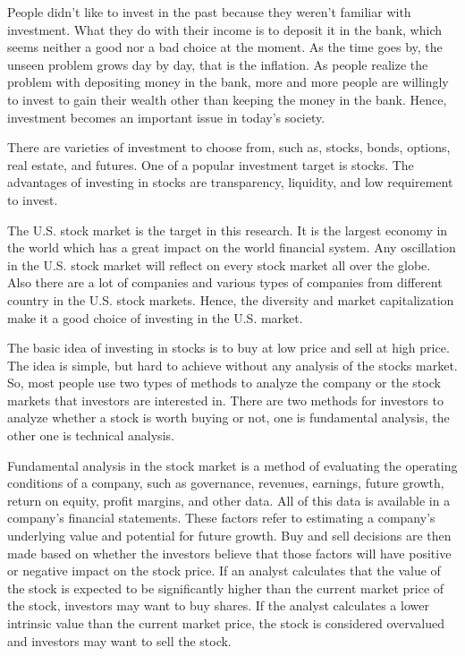 \documentclass[../main.tex]{subfiles}
\begin{document}

People didn't like to invest in the past because they weren't familiar with investment. What they do with their income is to deposit it in the bank, which seems neither a good nor a bad choice at the moment. As the time goes by, the unseen problem grows day by day, that is the inflation. As people realize the problem with depositing money in the bank, more and more people are willingly to invest to gain their wealth other than keeping the money in the bank. Hence, investment becomes an important issue in today's society.

\bigbreak

There are varieties of investment to choose from, such as, stocks, bonds, options, real estate, and futures. One of a popular investment target is stocks. The advantages of investing in stocks are transparency, liquidity, and low requirement to invest.

\bigbreak

The U.S. stock market is the target in this research. It is the largest economy in the world which has a great impact on the world financial system. Any oscillation in the U.S. stock market will reflect on every stock market all over the globe. Also there are a lot of companies and various types of companies from different country in the U.S. stock markets. Hence, the diversity and market capitalization make it a good choice of investing in the U.S. market.

\bigbreak

The basic idea of investing in stocks is to buy at low price and sell at high price. The idea is simple, but hard to achieve without any analysis of the stocks market. So, most people use two types of methods to analyze the company or the stock markets that investors are interested in. There are two methods for investors to analyze whether a stock is worth buying or not, one is fundamental analysis, the other one is technical analysis.

\bigbreak

Fundamental analysis in the stock market is a method of evaluating the operating conditions of a company, such as governance, revenues, earnings, future growth, return on equity, profit margins, and other data. All of this data is available in a company's financial statements. These factors refer to estimating a company's underlying value and potential for future growth. Buy and sell decisions are then made based on whether the investors believe that those factors will have positive or negative impact on the stock price. If an analyst calculates that the value of the stock is expected to be significantly higher than the current market price of the stock, investors may want to buy shares. If the analyst calculates a lower intrinsic value than the current market price, the stock is considered overvalued and investors may want to sell the stock.
\end{document}
